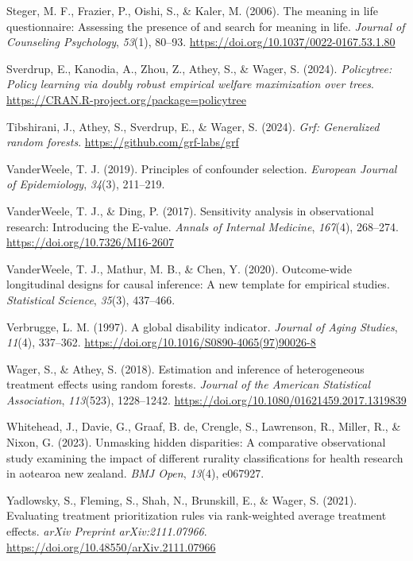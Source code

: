 \documentclass[
  single column]{article}
\newlength{\cslhangindent}
\newenvironment{CSLReferences}[2] %
 {\begin{list}{}{%
  \setlength{\itemindent}{0pt}
  \setlength{\leftmargin}{0pt}
  \setlength{\parsep}{0pt}
  \ifodd #1
   \setlength{\leftmargin}{\cslhangindent}
   \setlength{\itemindent}{-1\cslhangindent}
  \fi
  \setlength{\itemsep}{#2\baselineskip}}}
 {\end{list}}
\begin{document}
\begin{CSLReferences}{1}{0}
Steger, M. F., Frazier, P., Oishi, S., \& Kaler, M. (2006). The meaning
in life questionnaire: Assessing the presence of and search for meaning
in life. \emph{Journal of Counseling Psychology}, \emph{53}(1), 80--93.
\url{https://doi.org/10.1037/0022-0167.53.1.80}

Sverdrup, E., Kanodia, A., Zhou, Z., Athey, S., \& Wager, S. (2024).
\emph{Policytree: Policy learning via doubly robust empirical welfare
maximization over trees}.
\url{https://CRAN.R-project.org/package=policytree}

Tibshirani, J., Athey, S., Sverdrup, E., \& Wager, S. (2024). \emph{Grf:
Generalized random forests}. \url{https://github.com/grf-labs/grf}

VanderWeele, T. J. (2019). Principles of confounder selection.
\emph{European Journal of Epidemiology}, \emph{34}(3), 211--219.

VanderWeele, T. J., \& Ding, P. (2017). Sensitivity analysis in
observational research: Introducing the {E}-value. \emph{Annals of
Internal Medicine}, \emph{167}(4), 268--274.
\url{https://doi.org/10.7326/M16-2607}

VanderWeele, T. J., Mathur, M. B., \& Chen, Y. (2020). Outcome-wide
longitudinal designs for causal inference: A new template for empirical
studies. \emph{Statistical Science}, \emph{35}(3), 437--466.

Verbrugge, L. M. (1997). A global disability indicator. \emph{Journal of
Aging Studies}, \emph{11}(4), 337--362.
\url{https://doi.org/10.1016/S0890-4065(97)90026-8}

Wager, S., \& Athey, S. (2018). Estimation and inference of
heterogeneous treatment effects using random forests. \emph{Journal of
the American Statistical Association}, \emph{113}(523), 1228--1242.
\url{https://doi.org/10.1080/01621459.2017.1319839}

Whitehead, J., Davie, G., Graaf, B. de, Crengle, S., Lawrenson, R.,
Miller, R., \& Nixon, G. (2023). Unmasking hidden disparities: A
comparative observational study examining the impact of different
rurality classifications for health research in aotearoa new zealand.
\emph{BMJ Open}, \emph{13}(4), e067927.

Yadlowsky, S., Fleming, S., Shah, N., Brunskill, E., \& Wager, S.
(2021). Evaluating treatment prioritization rules via rank-weighted
average treatment effects. \emph{arXiv Preprint arXiv:2111.07966}.
\url{https://doi.org/10.48550/arXiv.2111.07966}

\end{CSLReferences}
\end{document}
